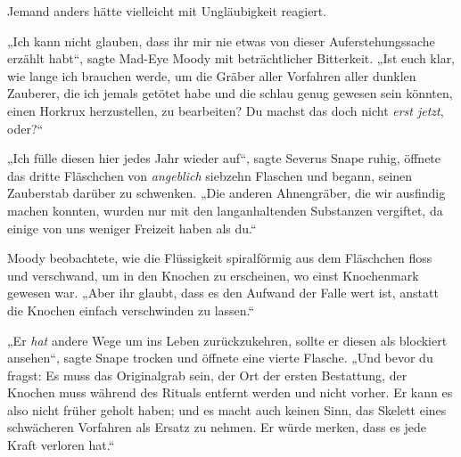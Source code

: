 Jemand anders hätte vielleicht mit Ungläubigkeit reagiert.

„Ich kann nicht glauben, dass ihr mir nie etwas von dieser Auferstehungssache erzählt habt“, sagte Mad-Eye Moody mit beträchtlicher Bitterkeit. „Ist euch klar, wie lange ich brauchen werde, um die Gräber aller Vorfahren aller dunklen Zauberer, die ich jemals getötet habe und die schlau genug gewesen sein könnten, einen Horkrux herzustellen, zu bearbeiten? Du machst das doch nicht \emph{erst jetzt}, oder?“

„Ich fülle diesen hier jedes Jahr wieder auf“, sagte Severus Snape ruhig, öffnete das dritte Fläschchen von \emph{angeblich} siebzehn Flaschen und begann, seinen Zauberstab darüber zu schwenken. „Die anderen Ahnengräber, die wir ausfindig machen konnten, wurden nur mit den langanhaltenden Substanzen vergiftet, da einige von uns weniger Freizeit haben als du.“

Moody beobachtete, wie die Flüssigkeit spiralförmig aus dem Fläschchen floss und verschwand, um in den Knochen zu erscheinen, wo einst Knochenmark gewesen war. „Aber ihr glaubt, dass es den Aufwand der Falle wert ist, anstatt die Knochen einfach verschwinden zu lassen.“

„Er \emph{hat} andere Wege um ins Leben zurückzukehren, sollte er diesen als blockiert ansehen“, sagte Snape trocken und öffnete eine vierte Flasche. „Und bevor du fragst: Es muss das Originalgrab sein, der Ort der ersten Bestattung, der Knochen muss während des Rituals entfernt werden und nicht vorher. Er kann es also nicht früher geholt haben; und es macht auch keinen Sinn, das Skelett eines schwächeren Vorfahren als Ersatz zu nehmen. Er würde merken, dass es jede Kraft verloren hat.“

